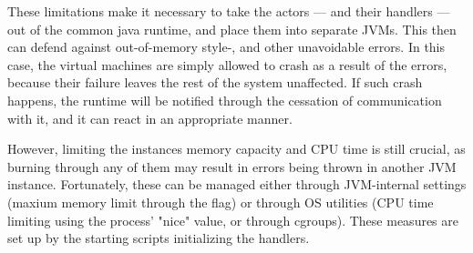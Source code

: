 	These limitations make it necessary to take the actors --- and their handlers --- out of the common java runtime, and place them into separate JVMs. This then can defend against out-of-memory style-, and other unavoidable errors. In this case, the virtual machines are simply allowed to crash as a result of the errors, because their failure leaves the rest of the system unaffected. If such crash happens, the runtime will be notified through the cessation of communication with it, and it can react in an appropriate manner.
	
	However, limiting the instances memory capacity and CPU time is still crucial, as burning through any of them may result in errors being thrown in another JVM instance. Fortunately, these can be managed either through JVM-internal settings (maxium memory limit through the  flag) or through OS utilities (CPU time limiting using the process' "nice" value, or through cgroups). These measures are set up by the starting scripts initializing the handlers.

%








